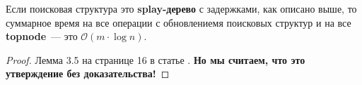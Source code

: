 \begin{lemma}
Если поисковая структура это \textbf{splay-дерево} с задержками, как описано выше, то суммарное время на все операции с обновлениемя поисковых структур и на все \textbf{topnode}~--- это $\mathcal{O}(m\cdot\log{n}).$
\end{lemma}
\begin{proof}
Лемма 3.5 на странице 16 в статье \cite{georgiadis2011data}. \textbf{Но мы считаем, что это утверждение без доказательства!}
\end{proof}

